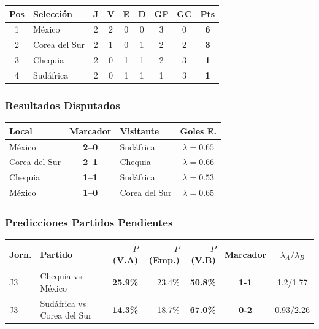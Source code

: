 \documentclass[11pt,a4paper]{article}
\newcommand{\prob}[1]{\textbf{#1\%}}
\begin{document}
\begin{center}
\begin{tabular}{@{}clccccccc@{}}
\toprule
\textbf{Pos} & \textbf{Selección} & \textbf{J} & \textbf{V} & \textbf{E} & \textbf{D} & \textbf{GF} & \textbf{GC} & \textbf{Pts} \\
\midrule
  \cellcolor{green!25}1 & \cellcolor{green!25}México & 2 & 2 & 0 & 0 & 3 & 0 & \textbf{6} \\
  \cellcolor{green!25}2 & \cellcolor{green!25}Corea del Sur & 2 & 1 & 0 & 1 & 2 & 2 & \textbf{3} \\
  \cellcolor{yellow!20}3 & \cellcolor{yellow!20}Chequia & 2 & 0 & 1 & 1 & 2 & 3 & \textbf{1} \\
  4 & Sudáfrica & 2 & 0 & 1 & 1 & 1 & 3 & \textbf{1} \\
\bottomrule
\end{tabular}
\end{center}

\subsubsection*{Resultados Disputados}

\begin{center}
\begin{tabular}{@{}lclc@{}}
\toprule
\textbf{Local} & \textbf{Marcador} & \textbf{Visitante} & \textbf{Goles E.} \\
\midrule
  México & \textbf{2--0} & Sudáfrica & $\lambda=0.65$ \\
  Corea del Sur & \textbf{2--1} & Chequia & $\lambda=0.66$ \\
  Chequia & \textbf{1--1} & Sudáfrica & $\lambda=0.53$ \\
  México & \textbf{1--0} & Corea del Sur & $\lambda=0.65$ \\
\bottomrule
\end{tabular}
\end{center}

\subsubsection*{Predicciones Partidos Pendientes}


\begin{center}
\begin{tabular}{@{}llrrrcc@{}}
\toprule
\textbf{Jorn.} & \textbf{Partido} & \textbf{$P$(V.A)} & \textbf{$P$(Emp.)} & \textbf{$P$(V.B)} & \textbf{Marcador} & \textbf{$\lambda_A/\lambda_B$} \\
\midrule
  J3 & Chequia vs México & \cellcolor{red!15}\prob{25.9} & 23.4\% & \cellcolor{yellow!30}\prob{50.8} & \textbf{1-1} & 1.2/1.77 \\
  J3 & Sudáfrica vs Corea del Sur & \cellcolor{red!15}\prob{14.3} & 18.7\% & \cellcolor{green!20}\prob{67.0} & \textbf{0-2} & 0.93/2.26 \\
\bottomrule
\end{tabular}
\end{center}
\end{document}
